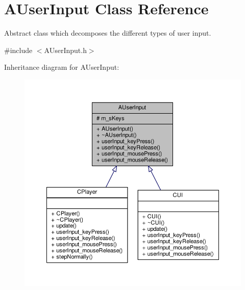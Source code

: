 \hypertarget{classAUserInput}{\section{A\-User\-Input Class Reference}
\label{classAUserInput}
}


Abstract class which decomposes the different types of user input.  




{\ttfamily \#include $<$A\-User\-Input.\-h$>$}



Inheritance diagram for A\-User\-Input\-:\nopagebreak
\begin{figure}[H]
\begin{center}
\leavevmode
\includegraphics[width=350pt]{classAUserInput__inherit__graph}
\end{center}
\end{figure}



